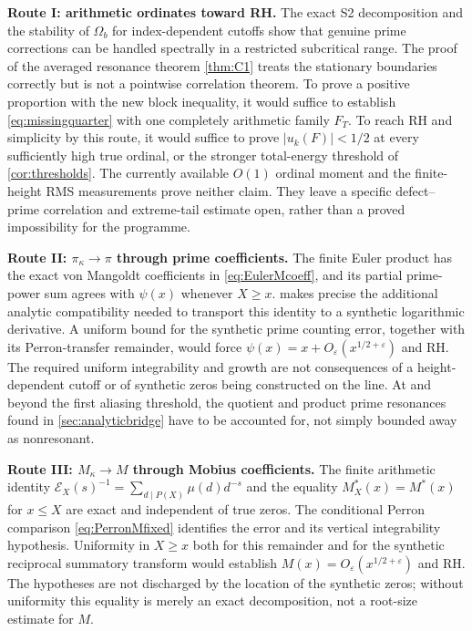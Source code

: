 \documentclass[11pt,reqno]{amsart}
\numberwithin{equation}{section}
\begin{document}
\medskip
\noindent\textbf{Route I: arithmetic ordinates toward RH.}
The exact S2 decomposition and the stability of $\Omega_b$ for
index-dependent cutoffs show that genuine prime corrections can be
handled spectrally in a restricted subcritical range.  The proof of
the averaged resonance theorem \cref{thm:C1} treats the stationary
boundaries correctly but is not a pointwise correlation theorem.
To prove a positive proportion with the new block inequality, it
would suffice to establish \eqref{eq:missingquarter} with one
completely arithmetic family $F_T$.  To reach RH and simplicity by
this route, it would suffice to prove $|u_k(F)|<1/2$ at every
sufficiently high true ordinal, or the stronger total-energy
threshold of \cref{cor:thresholds}.  The currently available
$O(1)$ ordinal moment and the finite-height RMS measurements
prove neither claim.  They leave a specific defect--prime
correlation and extreme-tail estimate open, rather than a proved
impossibility for the programme.

\medskip
\noindent\textbf{Route II: $\pi_{\kappa}\to\pi$ through prime coefficients.}
The finite Euler product has the exact von Mangoldt coefficients in
\eqref{eq:EulerMcoeff}, and its partial prime-power sum agrees with
$\psi(x)$ whenever $X\ge x$.
 makes precise the additional analytic
compatibility needed to transport this identity to a synthetic
logarithmic derivative.  A uniform bound for the synthetic prime
counting error, together with its Perron-transfer remainder, would
force $\psi(x)=x+O_\varepsilon(x^{1/2+\varepsilon})$ and RH.
The required uniform integrability and growth are not consequences
of a height-dependent cutoff or of synthetic zeros being
constructed on the line.  At and beyond the first aliasing
threshold, the quotient and product prime resonances found in
\cref{sec:analyticbridge} have to be accounted for, not simply
bounded away as nonresonant.

\medskip
\noindent\textbf{Route III: $M_{\kappa}\to M$ through Mobius coefficients.}
The finite arithmetic identity
$\mathscr E_X(s)^{-1}=\sum_{d\mid P(X)}\mu(d)d^{-s}$ and the equality
$M_X^*(x)=M^*(x)$ for $x\le X$ are exact and independent of true
zeros.  The conditional Perron comparison
\eqref{eq:PerronMfixed} identifies the error and its vertical
integrability hypothesis.  Uniformity in $X\ge x$ both for this
remainder and for the synthetic reciprocal summatory transform
would establish $M(x)=O_\varepsilon(x^{1/2+\varepsilon})$ and RH.
The hypotheses are not discharged by the location of the
synthetic zeros; without uniformity this equality is merely
an exact decomposition, not a root-size estimate for $M$.
\end{document}
